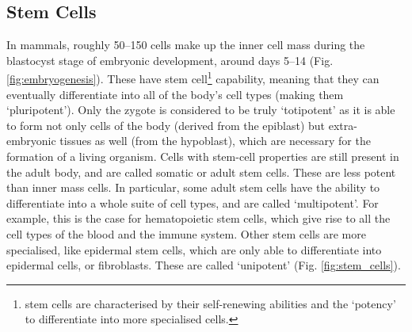 \subsection{Stem Cells}
\label{sec:escs} 

In mammals, roughly 50–150 cells make up the inner cell mass during the blastocyst stage of embryonic development, around days 5–14 (Fig. \ref{fig:embryogenesis}). 
These have stem cell\footnote{stem cells are characterised by their self-renewing abilities and the `potency' to differentiate into more specialised cells.} capability, meaning that they can eventually differentiate into all of the body's cell types (making them `pluripotent').
Only the zygote is considered to be truly `totipotent' as it is able to form not only cells of the body (derived from the epiblast) but extra-embryonic tissues as well (from the hypoblast), which are necessary for the formation of a living organism.
Cells with stem-cell properties are still present in the adult body, and are called somatic or adult stem cells.
These are less 
potent
than inner mass cells.
In particular, some adult stem cells have the ability to differentiate into a whole suite of cell types, and are called `multipotent'.
For example, this is the case for hematopoietic stem cells, which give rise to all the cell types of the blood and the immune system.
Other stem cells are more specialised, like epidermal stem cells, which are only able to differentiate into epidermal cells, or fibroblasts.
These are called `unipotent' (Fig. \ref{fig:stem_cells}).\\

